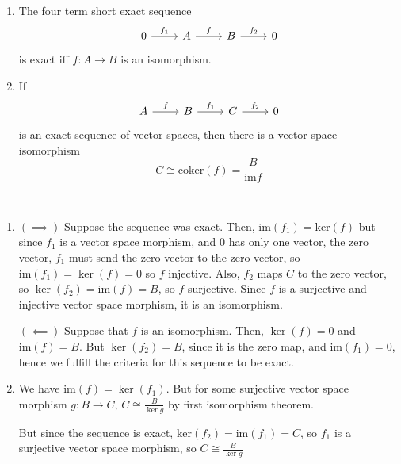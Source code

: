 \documentclass{article}
\begin{document}
\begin{proposition}
  \

  \begin{enumerate}
    \item The four term short exact sequence \[
        \begin{tikzcd}
          0 & A & B & 0
          \arrow[from=1-1, to=1-2, "f_1"]
          \arrow[from=1-2, to=1-3, "f"]
          \arrow[from=1-3, to=1-4, "f_2"]
      \end{tikzcd}\]is exact iff $f: A \to B$ is an isomorphism.
    \item If \[
        \begin{tikzcd}
          A & B & C & 0
          \arrow[from=1-1, to=1-2, "f"]
          \arrow[from=1-2, to=1-3, "f_1"]
          \arrow[from=1-3, to=1-4, "f_2"]
      \end{tikzcd}\]is an exact sequence of vector spaces, then there is a vector space isomorphism $$C \cong \text{coker}(f) = \frac{B}{\text{im} f}$$
  \end{enumerate}
\end{proposition}

\begin{customproof}
  \

  \begin{enumerate}
    \item $(\implies)$ Suppose the sequence was exact. Then, $\text{im}(f_1) = \text{ker}(f)$ but since $f_1$ is a vector space morphism, and $0$ has only one vector, the zero vector, $f_1$ must send the zero vector to the zero vector, so $\text{im}(f_1) = \ker(f) = 0$ so $f$ injective. Also, $f_2$ maps $C$ to the zero vector, so $\ker(f_2) = \text{im}(f) = B$, so $f$ surjective. Since $f$ is a surjective and injective vector space morphism, it is an isomorphism.

      $(\impliedby)$ Suppose that $f$ is an isomorphism. Then, $\ker(f) = 0$ and $\text{im}(f) = B$. But $\ker(f_2) = B$, since it is the zero map, and $\text{im}(f_1) = 0$, hence we fulfill the criteria for this sequence to be exact.
    \item We have $\text{im}(f) = \ker(f_1)$. But for some surjective vector space morphism $g: B \to C$, $C \cong \frac{B}{\ker g}$ by first isomorphism theorem.

      But since the sequence is exact, $\text{ker}(f_2) = \text{im}(f_1) = C$, so $f_1$ is a surjective vector space morphism, so $C \cong \frac{B}{\ker g}$
  \end{enumerate}
\end{customproof}
\end{document}
